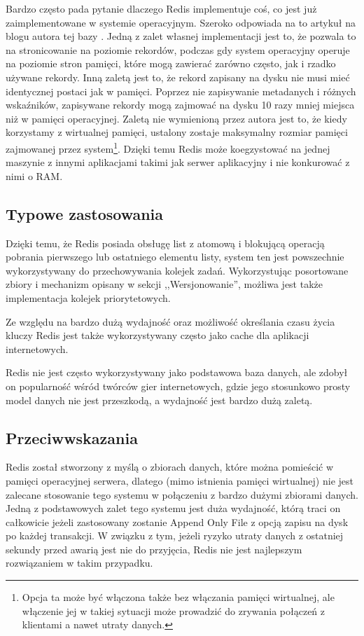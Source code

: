 Bardzo często pada pytanie dlaczego Redis implementuje coś, co jest już zaimplementowane w systemie operacyjnym.
Szeroko odpowiada na to artykuł na blogu autora tej bazy \cite{antirez-redis-vm}.
Jedną z zalet własnej implementacji jest to, że pozwala to na stronicowanie na poziomie rekordów, podczas gdy system operacyjny operuje na poziomie stron pamięci, które mogą zawierać zarówno często, jak i rzadko używane rekordy.
Inną zaletą jest to, że rekord zapisany na dysku nie musi mieć identycznej postaci jak w pamięci.
Poprzez nie zapisywanie metadanych i różnych wskaźników, zapisywane rekordy mogą zajmować na dysku 10 razy mniej miejsca niż w pamięci operacyjnej.
Zaletą nie wymienioną przez autora jest to, że kiedy korzystamy z wirtualnej pamięci, ustalony zostaje maksymalny rozmiar pamięci zajmowanej przez system\footnote{Opcja ta może być włączona także bez włączania pamięci wirtualnej, ale włączenie jej w takiej sytuacji może prowadzić do zrywania połączeń z klientami a nawet utraty danych.}.
Dzięki temu Redis może koegzystować na jednej maszynie z innymi aplikacjami takimi jak serwer aplikacyjny i nie konkurować z nimi o RAM.

\subsection*{Typowe zastosowania}

Dzięki temu, że Redis posiada obsługę list z atomową i blokującą operacją pobrania pierwszego lub ostatniego elementu listy, system ten jest powszechnie wykorzystywany do przechowywania kolejek zadań.
Wykorzystując posortowane zbiory i mechanizm opisany w sekcji ,,Wersjonowanie'', możliwa jest także implementacja kolejek priorytetowych.

Ze względu na bardzo dużą wydajność oraz możliwość określania czasu życia kluczy Redis jest także wykorzystywany często jako cache dla aplikacji internetowych.

Redis nie jest często wykorzystywany jako podstawowa baza danych, ale zdobył on popularność wśród twórców gier internetowych, gdzie jego stosunkowo prosty model danych nie jest przeszkodą, a wydajność jest bardzo dużą zaletą.

\subsection*{Przeciwwskazania}

Redis został stworzony z myślą o zbiorach danych, które można pomieścić w pamięci operacyjnej serwera, dlatego (mimo istnienia pamięci wirtualnej) nie jest zalecane stosowanie tego systemu w połączeniu z bardzo dużymi zbiorami danych.
Jedną z podstawowych zalet tego systemu jest duża wydajność, którą traci on całkowicie jeżeli zastosowany zostanie Append Only File z opcją zapisu na dysk po każdej transakcji.
W związku z tym, jeżeli ryzyko utraty danych z ostatniej sekundy przed awarią jest nie do przyjęcia, Redis nie jest najlepszym rozwiązaniem w takim przypadku.


